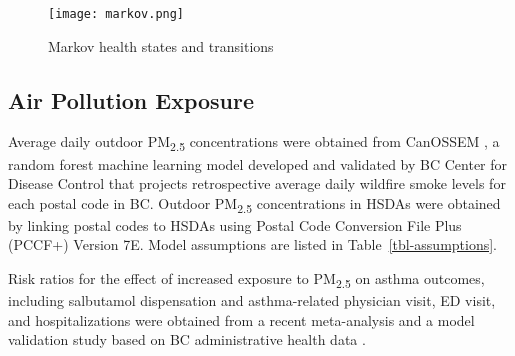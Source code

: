 \documentclass[
  number]{elsarticle}
\begin{document}
\begin{figure}

{\centering \texttt{[image: markov.png]}

}

\caption{\label{fig-markov}Markov health states and transitions}

\end{figure}

\hypertarget{air-pollution-exposure}{%
\subsection{Air Pollution Exposure}\label{air-pollution-exposure}}

Average daily outdoor PM\textsubscript{2.5} concentrations were obtained
from CanOSSEM \citep{PAUL2022157956}, a random forest machine learning
model developed and validated by BC Center for Disease Control that
projects retrospective average daily wildfire smoke levels for each
postal code in BC. Outdoor PM\textsubscript{2.5} concentrations in HSDAs
were obtained by linking postal codes to HSDAs using Postal Code
Conversion File Plus (PCCF+) Version 7E\citep{AB2/D1AO5H_2022}. Model
assumptions are listed in Table~\ref{tbl-assumptions}.

Risk ratios for the effect of increased exposure to
PM\textsubscript{2.5} on asthma outcomes, including salbutamol
dispensation and asthma-related physician visit, ED visit, and
hospitalizations were obtained from a recent
meta-analysis\citep{borchers_arriagada_association_2019} and a model
validation study based on BC administrative health data \citep{yao2014}.
\end{document}

